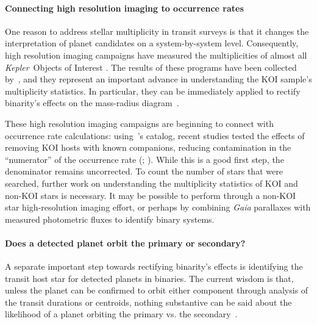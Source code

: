 \documentclass[12pt,modern]{aastex61}
\begin{document}
\paragraph{Connecting high resolution imaging to occurrence rates}
One reason to address stellar multiplicity in transit surveys is that it 
changes the interpretation of planet candidates on a system-by-system level.
Consequently, high resolution imaging 
campaigns have measured the multiplicities of almost all {\it Kepler}\ Objects 
of Interest 
\citep{howell_speckle_2011,adams_adaptive_2012,adams_adaptive_2013,horch_observations_2012,
    horch_most_2014,lillo-box_multiplicity_2012,lillo-box_high-resolution_2014,dressing_adaptive_2014,
    law_robotic_2014,cartier_revision_2015,everett_high-resolution_2015,gilliland_hubble_2015,
    wang_influence_2015,wang_influence_2015-1,baranec_robo-ao_2016,ziegler_robo-ao_2017}.
The results of these programs have been collected 
by~\citet{furlan_kepler_2017}, and they represent an important advance in 
understanding the KOI 
sample's multiplicity statistics.
In particular, they can be immediately applied to rectify binarity's effects 
on the mass-radius diagram~\citep{furlan_densities_2017}.

These high resolution imaging campaigns are beginning to connect with
occurrence rate calculations: using~\citet{furlan_kepler_2017}'s 
catalog, recent studies tested the effects of removing KOI hosts with known 
companions, reducing contamination in the ``numerator'' of 
the occurrence rate (\citealt{fulton_california-_2017}; 
\citealt{petigura_CKS_2017}).
While this is a good first step, the denominator remains uncorrected.
To count the number of stars that were searched, further work on
understanding the multiplicity statistics of KOI and non-KOI stars is 
necessary. It may be possible to perform through a non-KOI star 
high-resolution imaging effort, or perhaps by combining
{\it Gaia} parallaxes with measured photometric fluxes to identify binary 
systems.

\paragraph{Does a detected planet orbit the primary or secondary?}
A separate important step towards rectifying binarity's effects is identifying 
the transit host star for detected planets in binaries.
The current 
wisdom is that, unless the planet can be confirmed to orbit either 
component through analysis of the transit durations or centroids, nothing 
substantive can be said about the 
likelihood of a planet orbiting the primary vs. the 
secondary~\citep[\textit{e.g.},][]{ciardi_understanding_2015,ziegler_robo-ao_2017}.
\end{document}
